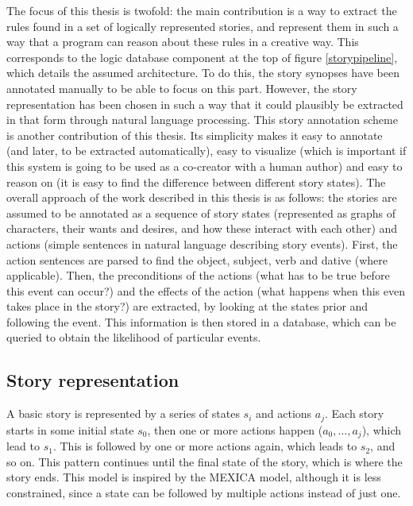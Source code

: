 The focus of this thesis is twofold: the main contribution is a way to extract the rules found in a set of
logically represented stories, and represent them in such a way that a program can reason about
these rules in a creative way. This corresponds to the logic database component at the top
of figure \ref{storypipeline}, which details the assumed architecture. To do this, the story synopses have been
annotated manually to be able to focus on this part. However, the story
representation has been chosen in such a way that it could plausibly be extracted
in that form through natural language processing. 
This story annotation scheme is another contribution of this thesis. Its
simplicity makes it easy to annotate (and later, to be extracted automatically),
easy to visualize (which is important if this system is going to be used as a
co-creator with a human author) and easy to reason on (it is easy to find the
difference between different story states).
The overall approach of the work described in this thesis is as follows: the
stories are assumed to be annotated as a sequence of story states (represented
as graphs of characters, their wants and desires, and how these interact with
each other) and actions (simple sentences in natural language describing story
events). First, the action sentences are parsed to find the object, subject,
verb and dative (where applicable). Then, the preconditions of the actions (what
has to be true before this event can occur?) and the effects of the action (what
happens when this even takes place in the story?) are extracted, by looking at
the states prior and following the event. This information is then stored in a
database, which can be queried to obtain the likelihood of particular events.

\subsection{Story representation}

A basic story is represented by a series of states $s_i$ and actions $a_j$.
Each story starts in some initial state $s_0$, then one or more actions happen
($a_0, ..., a_j$), which lead to $s_1$. This is followed by one or more actions
again, which leads to $s_2$, and so on. This pattern continues until the final 
state of the story, which is where the story ends. This model is inspired by the
MEXICA model, although it is less constrained, since a state can be followed by
multiple actions instead of just one.

